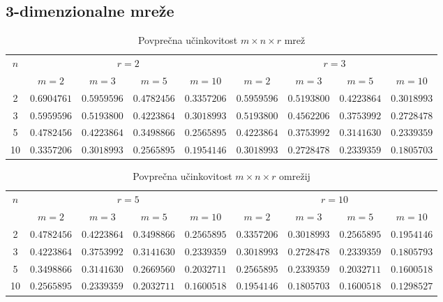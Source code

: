 \documentclass[a4paper, 16pt]{article}
\begin{document}
    \subsection{3-dimenzionalne mreže}
    \begin{table}[!h]
        \begin{tabular}{c|c|c|c|c||c|c|c|c}
            \multirow{2}{*}{$n$} & 
            \multicolumn{4}{c}{$r = 2$} & \multicolumn{4}{c}{$r = 3$}\\
               & $m=2$       & $m=3$       & $m=5$       & $m=10$      & $m = 2$     & $m = 3$    & $m=5$        & $m=10$ \\ \hline
            2  & $0.6904761$ & $0.5959596$ & $0.4782456$ & $0.3357206$ & $0.5959596$ & $0.5193800$ & $0.4223864$ & $0.3018993$\\
            3  & $0.5959596$ & $0.5193800$ & $0.4223864$ & $0.3018993$ & $0.5193800$ & $0.4562206$ & $0.3753992$ & $0.2728478$\\
            5  & $0.4782456$ & $0.4223864$ & $0.3498866$ & $0.2565895$ & $0.4223864$ & $0.3753992$ & $0.3141630$ & $0.2339359$ \\
            10 & $0.3357206$ & $0.3018993$ & $0.2565895$ & $0.1954146$ & $0.3018993$ & $0.2728478$ & $0.2339359$ & $0.1805703$\\

        \end{tabular}
        \caption{Povprečna učinkovitost $m \times n \times r$ mrež}
        \label{table: 2}
    \end{table}

    \begin{table}[!h]
        \begin{tabular}{c|c|c|c|c||c|c|c|c}
            \multirow{2}{*}{$n$} & 
            \multicolumn{4}{c}{$r = 5$} & \multicolumn{4}{c}{$r = 10$}\\
               & $m=2$       & $m=3$       & $m=5$       & $m=10$      & $m = 2$     & $m = 3$     & $m=5$       & $m=10$ \\ \hline
            2  & $0.4782456$ & $0.4223864$ & $0.3498866$ & $0.2565895$ & $0.3357206$ & $0.3018993$ & $0.2565895$ & $0.1954146$\\
            3  & $0.4223864$ & $0.3753992$ & $0.3141630$ & $0.2339359$ & $0.3018993$ & $0.2728478$ & $0.2339359$ & $0.1805793$\\
            5  & $0.3498866$ & $0.3141630$ & $0.2669560$ & $0.2032711$ & $0.2565895$ & $0.2339359$ & $0.2032711$ & $0.1600518$\\
            10 & $0.2565895$ & $0.2339359$ & $0.2032711$ & $0.1600518$ & $0.1954146$ & $0.1805703$ & $0.1600518$ & $0.1298527$\\

        \end{tabular}
        \caption{Povprečna učinkovitost $m \times n \times r$ omrežij}
        \label{table: 3}
    \end{table}
\end{document}
